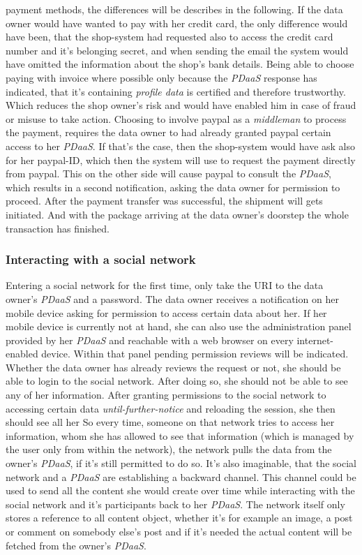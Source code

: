\documentclass[12pt,english,a4paper,titlepage,cleardoublepage=empty,dottedtoc]{report}
\begin{document}
payment methods, the differences will be describes in the following. If
the data owner would have wanted to pay with her credit card, the only
difference would have been, that the shop-system had requested also to
access the credit card number and it's belonging secret, and when
sending the email the system would have omitted the information about
the shop's bank details. Being able to choose paying with invoice where
possible only because the \emph{PDaaS} response has indicated, that it's
containing \emph{profile data} is certified and therefore trustworthy.
Which reduces the shop owner's risk and would have enabled him in case
of fraud or misuse to take action. Choosing to involve paypal as a
\emph{middleman} to process the payment, requires the data owner to had
already granted paypal certain access to her \emph{PDaaS}. If that's the
case, then the shop-system would have ask also for her paypal-ID, which
then the system will use to request the payment directly from paypal.
This on the other side will cause paypal to consult the \emph{PDaaS},
which results in a second notification, asking the data owner for
permission to proceed. After the payment transfer was successful, the
shipment will gets initiated. And with the package arriving at the data
owner's doorstep the whole transaction has finished.

\subsubsection{Interacting with a social
network}\label{interacting-with-a-social-network}

Entering a social network for the first time, only take the URI to the
data owner's \emph{PDaaS} and a password. The data owner receives a
notification on her mobile device asking for permission to access
certain data about her. If her mobile device is currently not at hand,
she can also use the administration panel provided by her \emph{PDaaS}
and reachable with a web browser on every internet-enabled device.
Within that panel pending permission reviews will be indicated. Whether
the data owner has already reviews the request or not, she should be
able to login to the social network. After doing so, she should not be
able to see any of her information. After granting permissions to the
social network to accessing certain data \emph{until-further-notice} and
reloading the session, she then should see all her So every time,
someone on that network tries to access her information, whom she has
allowed to see that information (which is managed by the user only from
within the network), the network pulls the data from the owner's
\emph{PDaaS}, if it's still permitted to do so. It's also imaginable,
that the social network and a \emph{PDaaS} are establishing a backward
channel. This channel could be used to send all the content she would
create over time while interacting with the social network and it's
participants back to her \emph{PDaaS}. The network itself only stores a
reference to all content object, whether it's for example an image, a
post or comment on somebody else's post and if it's needed the actual
content will be fetched from the owner's \emph{PDaaS}.
\end{document}
